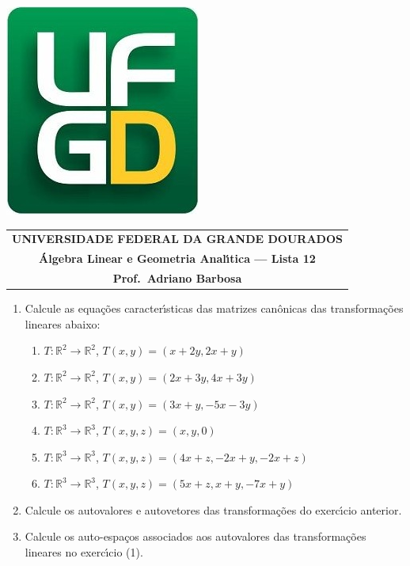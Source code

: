 \documentclass[a4paper,5pt]{amsbook}
\begin{document}
\thispagestyle{empty}
\pagestyle{empty}
\begin{minipage}[h]{0.14\textwidth}
	\includegraphics[scale=0.24]{../../ufgd.png}
\end{minipage}
\begin{minipage}[h]{\textwidth}
\begin{tabular}{c}
{{\bf UNIVERSIDADE FEDERAL DA GRANDE DOURADOS}}\\
{{\bf \'{A}lgebra Linear e Geometria Anal\'{\i}tica --- Lista 12}}\\
{{\bf Prof.\ Adriano Barbosa}}\\
\end{tabular}
\vspace{-0.45cm}
%
\end{minipage}


\vspace{1cm}
\begin{enumerate}
	\vspace{0.5cm}
	\item Calcule as equa\c{c}\~oes caracter\'{\i}sticas das matrizes can\^onicas das
		transforma\c{c}\~oes lineares abaixo:
		\begin{enumerate}
			\item $T:\mathbb{R}^2 \rightarrow \mathbb{R}^2$, $T(x,y) = (x+2y, 2x+y)$
			\item $T:\mathbb{R}^2 \rightarrow \mathbb{R}^2$, $T(x,y) = (2x+3y, 4x+3y)$
			\item $T:\mathbb{R}^2 \rightarrow \mathbb{R}^2$, $T(x,y) = (3x+y, -5x-3y)$
			\item $T:\mathbb{R}^3 \rightarrow \mathbb{R}^3$, $T(x,y,z) = (x, y, 0)$
			\item $T:\mathbb{R}^3 \rightarrow \mathbb{R}^3$, $T(x,y,z) = (4x+z, -2x+y, -2x+z)$
			\item $T:\mathbb{R}^3 \rightarrow \mathbb{R}^3$, $T(x,y,z) = (5x+z, x+y, -7x+y)$
		\end{enumerate}

	\vspace{0.5cm}
	\item Calcule os autovalores e autovetores das transforma\c{c}\~oes do exerc\'{\i}cio
		anterior.

	\vspace{0.5cm}
	\item Calcule os auto-espa\c{c}os associados aos autovalores das transforma\c{c}\~oes
		lineares no exerc\'{\i}cio (1).
\end{enumerate}
\end{document}
